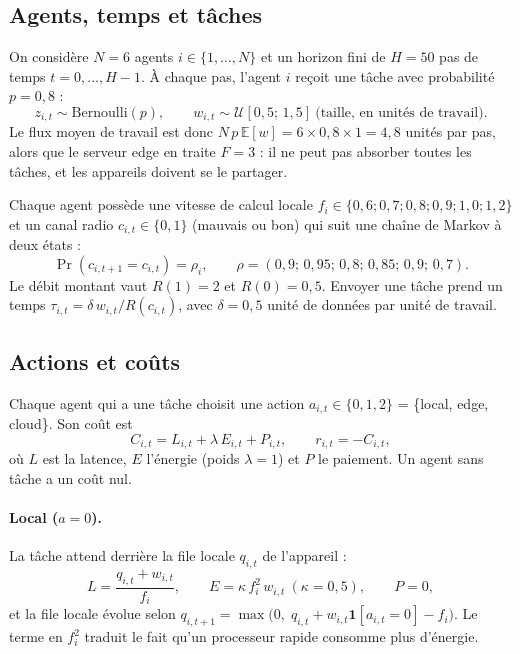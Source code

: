 \documentclass[11pt,a4paper]{article}
\newcommand{\E}{\mathbb{E}}
\newcommand{\ind}{\mathbf{1}}
\begin{document}
\subsection{Agents, temps et tâches}

On considère $N=6$ agents $i\in\{1,\dots,N\}$ et un horizon fini de $H=50$ pas de temps $t=0,\dots,H-1$.
À chaque pas, l'agent $i$ reçoit une tâche avec probabilité $p=0{,}8$ :
\[
  z_{i,t}\sim\mathrm{Bernoulli}(p),\qquad
  w_{i,t}\sim\mathcal{U}[0{,}5;\,1{,}5]\ \text{(taille, en unités de travail)} .
\]
Le flux moyen de travail est donc $N\,p\,\E[w]=6\times0{,}8\times1=4{,}8$ unités par pas, alors que le serveur
edge en traite $F=3$ : il ne peut pas absorber toutes les tâches, et les appareils doivent se le partager.

Chaque agent possède une vitesse de calcul locale $f_i\in\{0{,}6;0{,}7;0{,}8;0{,}9;1{,}0;1{,}2\}$ et un canal
radio $c_{i,t}\in\{0,1\}$ (mauvais ou bon) qui suit une chaîne de Markov à deux états :
\[
  \Pr(c_{i,t+1}=c_{i,t})=\rho_i,\qquad \rho=(0{,}9;\,0{,}95;\,0{,}8;\,0{,}85;\,0{,}9;\,0{,}7).
\]
Le débit montant vaut $R(1)=2$ et $R(0)=0{,}5$. Envoyer une tâche prend un temps
$\tau_{i,t}=\delta\,w_{i,t}/R(c_{i,t})$, avec $\delta=0{,}5$ unité de données par unité de travail.

\subsection{Actions et coûts}

Chaque agent qui a une tâche choisit une action $a_{i,t}\in\{0,1,2\}$ = \{local, edge, cloud\}. Son coût est
\begin{equation}
  C_{i,t} = L_{i,t} + \lambda\,E_{i,t} + P_{i,t},
  \qquad r_{i,t}=-C_{i,t},
\end{equation}
où $L$ est la latence, $E$ l'énergie (poids $\lambda=1$) et $P$ le paiement. Un agent sans tâche a un coût nul.

\paragraph{Local ($a=0$).} La tâche attend derrière la file locale $q_{i,t}$ de l'appareil :
\[
  L = \frac{q_{i,t}+w_{i,t}}{f_i},\qquad E=\kappa\,f_i^2\,w_{i,t}\ (\kappa=0{,}5),\qquad P=0,
\]
et la file locale évolue selon $q_{i,t+1}=\max\bigl(0,\;q_{i,t}+w_{i,t}\ind[a_{i,t}=0]-f_i\bigr)$.
Le terme en $f_i^2$ traduit le fait qu'un processeur rapide consomme plus d'énergie.
\end{document}
